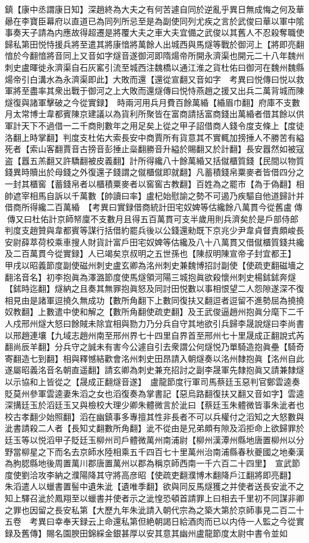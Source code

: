 鎮【康中丞謂康日知】深趙終為大夫之有何苦遽自同於逆亂乎異日無成悔之何及華曏在李寶臣幕府以直道已為同列所忌至是為副使同列尤疾之言於武俊曰華以軍中隂事奏天子請為内應故得超遷是將覆大夫之車大夫宜備之武俊以其舊人不忍殺奪職使歸私第田悦恃援兵將至遣其將康愔將萬餘人出城西與馬燧等戰於御河上【將即亮翻愔於今翻愔將音同上又音如字燧音遂御河即隋煬帝所開永濟渠也開元二十八年魏州刺史盧暉徙永濟渠自石灰窰引流至城西注魏橋以通江淮之貨杜佑曰御河在魏州魏縣煬帝引白溝水為永濟渠即此】大敗而還【還從宣翻又音如字　考異曰悦傳曰悦以救軍將至盡率其衆出戰于御河之上大敗而還燧傳曰悦恃燕趙之援又出兵二萬背城而陳燧復與諸軍擊破之今從實録】　時兩河用兵月費百餘萬緍【緍眉巾翻】府庫不支數月太常博士韋都賓陳京建議以為貨利所聚皆在富商請括富商錢出萬緍者借其餘以供軍計天下不過借一二千商則數年之用足矣上從之甲子詔借商人錢令度支條上【度徒洛翻上時掌翻】判度支杜佑大索長安中商賈所有貨意其不實輒加搒捶人不勝苦有縊死者【索山客翻賈音古搒音彭捶止橤翻勝音升縊於賜翻又於計翻】長安囂然如被寇盗【囂五羔翻又許驕翻被皮義翻】計所得纔八十餘萬緍又括僦櫃質錢【民間以物質錢異時贖出於母錢之外復還子錢謂之僦櫃僦即就翻】凡蓄積錢帛粟麥者皆借四分之一封其櫃窖【蓄錢帛者以櫃積粟麥者以窖窖古教翻】百姓為之罷市【為于偽翻】相帥遮宰相馬自訴以千萬數【帥讀曰率】盧杞始慰諭之勢不可遏乃疾驅自他道歸計并借商所得纔二百萬緍　【考異曰實録借商統計田宅奴婢等估纔餘八萬貫今從舊盧傳傳又曰杜佑計京師帑廩不支數月且得五百萬貫可支半歲用則兵濟矣於是戶部侍郎判度支趙贊與韋都賓等謀行括借約罷兵後以公錢還勑既下京兆少尹韋貞督責頗峻長安尉薛萃荷校乘車搜人財貨計富戶田宅奴婢等估纔及八十八萬貫又借僦櫃質錢共纔及二百萬貫今從實録】人已竭矣京叔明之五世孫也【陳叔明陳宣帝子封宜都王】　甲戌以昭義節度副使磁州刺史盧玄卿為洺州刺史兼魏博招討副使【使疏吏翻磁墻之翻洺音名】初李抱眞為澤潞節度使馬燧領河陽三城抱眞欲殺懷州刺史楊鉥鉥奔燧【鉥時迄翻】燧納之且奏其無罪抱眞怒及同討田悦數以事相恨望二人怨隙遂深不復相見由是諸軍逗撓久無成功【數所角翻下上數同復扶又翻逗者逗留不進勢屈為撓撓奴教翻】上數遣中使和解之【數所角翻使疏吏翻】及王武俊逼趙州抱眞分麾下二千人戍邢州燧大怒曰餘賊未除宜相與勠力乃分兵自守其地欲引兵歸李晟說燧曰李尚書以邢趙連壤【九域志趙州南至邢州界七十四里自界首至邢州七十里晟成正翻說式芮翻尚辰羊翻】分兵守之誠未有害今公遽自引去衆謂公何燧悦乃單騎造抱眞壘【騎奇寄翻造七到翻】相與釋憾結歡會洺州刺史田昂請入朝燧奏以洺州隸抱眞【洺州自此遂屬昭義洺音名朝直遥翻】請玄卿為刺史兼充招討之副李晟軍先隸抱眞又請兼隸燧以示協和上皆從之【晟成正翻燧音遂】　盧龍節度行軍司馬蔡廷玉惡判官鄭雲逵奏貶莫州參軍雲逵妻朱滔之女也滔復奏為掌書記【惡烏路翻復扶又翻又音如字】雲逵深搆廷玉於滔廷玉又與檢校大理少卿朱體微言於泚曰【蔡廷玉朱體微皆事朱泚者也校古孝翻少始照翻】滔在幽鎮事多專擅其性非長者不可以兵權付之滔知之大怒數與泚書請殺二人者【長知丈翻數所角翻】泚不從由是兄弟頗有隙及滔拒命上欲歸罪於廷玉等以悦滔甲子貶廷玉柳州司戶體微萬州南浦尉【柳州漢潭州縣地唐置柳州以分野當柳星之下而名去京師水陸相乘五千四百七十里萬州治南浦縣春秋夔國之地秦漢為朐䏰縣地後周置萬川郡唐置萬州以郡為稱京師西南一千六百二十四里】　宣武節度使劉洽攻李納之濮陽降其守將高彦昭【使疏吏翻濮博木翻降戶江翻將即亮翻】　朱滔遣人以蠟書置髻中遺朱泚【遺唯季翻】欲與同反馬燧獲之并使者送長安泚不之知上驛召泚於鳳翔至以蠟書并使者示之泚惶恐頓首請罪上曰相去千里初不同謀非卿之罪也因留之長安私第【大歷九年朱泚請入朝代宗為之築大第於京師事見二百二十五卷　考異曰幸奉天録云上命還私第但絶朝謁日給酒肉而已以内侍一人監之今從實録及舊傳】賜名園腴田錦綵金銀甚厚以安其意其幽州盧龍節度太尉中書令並如
